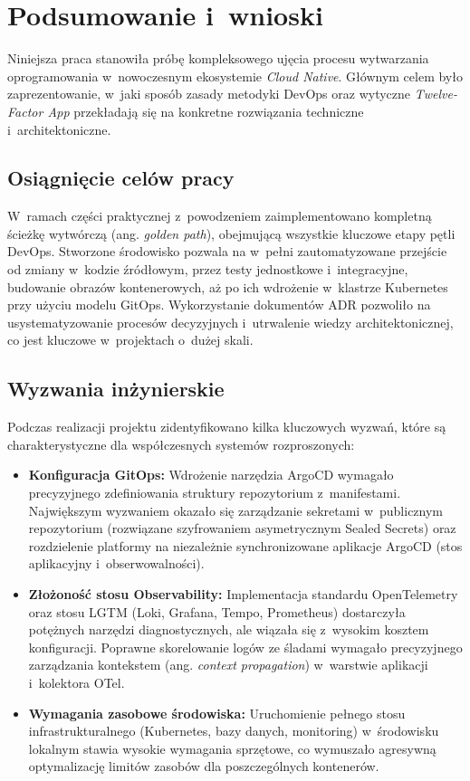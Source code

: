 \newpage
\section{Podsumowanie i~wnioski}
Niniejsza praca stanowiła próbę kompleksowego ujęcia procesu wytwarzania oprogramowania w~nowoczesnym ekosystemie \textit{Cloud Native}. Głównym celem było zaprezentowanie, w~jaki sposób zasady metodyki DevOps oraz wytyczne \textit{Twelve-Factor App} przekładają się na konkretne rozwiązania techniczne i~architektoniczne.

\subsection{Osiągnięcie celów pracy}
W~ramach części praktycznej z~powodzeniem zaimplementowano kompletną ścieżkę wytwórczą (ang. \textit{golden path}), obejmującą wszystkie kluczowe etapy pętli DevOps. Stworzone środowisko pozwala na w~pełni zautomatyzowane przejście od zmiany w~kodzie źródłowym, przez testy jednostkowe i~integracyjne, budowanie obrazów kontenerowych, aż po ich wdrożenie w~klastrze Kubernetes przy użyciu modelu GitOps. Wykorzystanie dokumentów ADR pozwoliło na usystematyzowanie procesów decyzyjnych i~utrwalenie wiedzy architektonicznej, co jest kluczowe w~projektach o~dużej skali.

\subsection{Wyzwania inżynierskie}
Podczas realizacji projektu zidentyfikowano kilka kluczowych wyzwań, które są charakterystyczne dla współczesnych systemów rozproszonych:
\begin{itemize}
    \item \textbf{Konfiguracja GitOps:} Wdrożenie narzędzia ArgoCD wymagało precyzyjnego zdefiniowania struktury repozytorium z~manifestami. Największym wyzwaniem okazało się zarządzanie sekretami w~publicznym repozytorium (rozwiązane szyfrowaniem asymetrycznym Sealed Secrets) oraz rozdzielenie platformy na niezależnie synchronizowane aplikacje ArgoCD (stos aplikacyjny i~obserwowalności).
    \item \textbf{Złożoność stosu Observability:} Implementacja standardu OpenTelemetry oraz stosu LGTM (Loki, Grafana, Tempo, Prometheus) dostarczyła potężnych narzędzi diagnostycznych, ale wiązała się z~wysokim kosztem konfiguracji. Poprawne skorelowanie logów ze śladami wymagało precyzyjnego zarządzania kontekstem (ang. \textit{context propagation}) w~warstwie aplikacji i~kolektora OTel.
    \item \textbf{Wymagania zasobowe środowiska:} Uruchomienie pełnego stosu infrastrukturalnego (Kubernetes, bazy danych, monitoring) w~środowisku lokalnym stawia wysokie wymagania sprzętowe, co wymuszało agresywną optymalizację limitów zasobów dla poszczególnych kontenerów.
\end{itemize}

